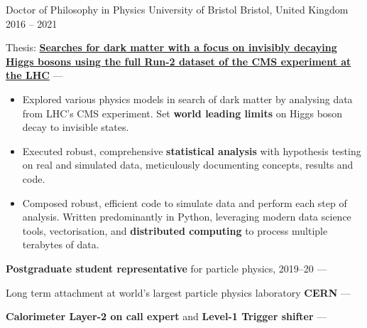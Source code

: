 
\newcommand{\vPaddingLength}{0.75mm}
\newcommand{\vpaddingEduSubpoint}{\vspace{\vPaddingLength}} %


\begin{cventries}
    \cventry
        {Doctor of Philosophy in Physics} %
        {University of Bristol} %
        {Bristol, United Kingdom} %
        {2016 -- 2021} %
        {
        \begin{cvitems} %
            \item {Thesis: \textbf{\href{https://research-information.bris.ac.uk/en/studentTheses/the-dark-side-of-the-higgs}{Searches for dark matter with a focus on invisibly decaying Higgs bosons using the full Run-2 dataset of the CMS experiment at the LHC}} --- }
            \vpaddingEduSubpoint
            \begin{itemize}[itemsep=\vPaddingLength, label=\bullet]
                \item{Explored various physics models in search of dark matter by analysing data from LHC's CMS experiment. Set \textbf{world leading limits} on Higgs boson decay to invisible states.}
                \item{Executed robust, comprehensive \textbf{statistical analysis} with hypothesis testing on real and simulated data, meticulously documenting concepts, results and code.}
                \item{Composed robust, efficient code to simulate data and perform each step of analysis. Written predominantly in Python, leveraging modern data science tools, vectorisation, and \textbf{distributed computing} to process multiple terabytes of data.}
            \end{itemize}
            \item {\textbf{Postgraduate student representative} for particle physics, 2019--20 --- }
            \item {Long term attachment at world's largest particle physics laboratory \textbf{CERN} --- }
            \item {\textbf{Calorimeter Layer-2 on call expert} and \textbf{Level-1 Trigger shifter} --- }

\end{cvitems}}
\end{cventries}
